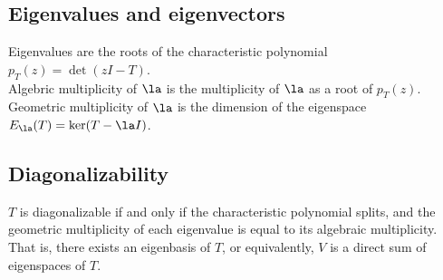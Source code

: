 \documentclass[10pt]{LatexTemplate/hw}
\begin{document}
\begin{multicols*}{2}
\section{Eigenvalues and eigenvectors}
Eigenvalues are the roots of the characteristic polynomial $p_T(z)=\det(zI-T)$.\\
Algebric multiplicity of $\la$ is the multiplicity of $\la$ as a root of $p_T(z)$.\\
Geometric multiplicity of $\la$ is the dimension of the eigenspace $E_\la(T)=\ker(T-\la I)$.
\subsection{Diagonalizability}
$T$ is diagonalizable if and only if the characteristic polynomial splits, and the geometric multiplicity of each eigenvalue is equal to its algebraic multiplicity.\\
That is, there exists an eigenbasis of $T$, or equivalently, $V$ is a direct sum of eigenspaces of $T$.

\end{multicols*}
\end{document}
